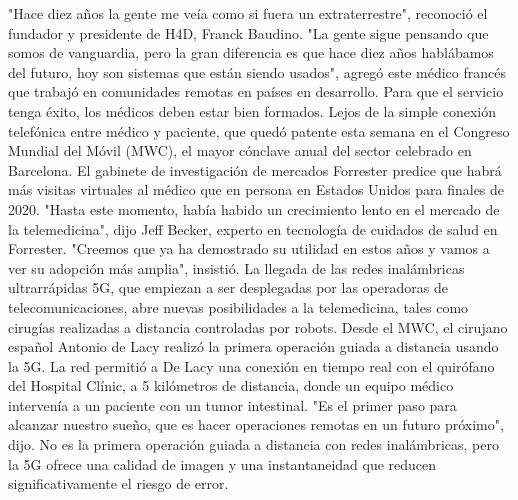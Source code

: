 \documentclass{article}%
\begin{document}
\newline%
%
"Hace diez años la gente me veía como si fuera un extraterrestre", reconoció el fundador y presidente de H4D, Franck Baudino.%
\newline%
%
"La gente sigue pensando que somos de vanguardia, pero la gran diferencia es que hace diez años hablábamos del futuro, hoy son sistemas que están siendo usados", agregó este médico francés que trabajó en comunidades remotas en países en desarrollo. \newline%
\newline%
Para que el servicio tenga éxito, los médicos deben estar bien formados.%
\newline%
%
Lejos de la simple conexión telefónica entre médico y paciente, que quedó patente esta semana en el Congreso Mundial del Móvil (MWC), el mayor cónclave anual del sector celebrado en Barcelona. \newline%
\newline%
El gabinete de investigación de mercados Forrester predice que habrá más visitas virtuales al médico que en persona en Estados Unidos para finales de 2020.%
\newline%
%
"Hasta este momento, había habido un crecimiento lento en el mercado de la telemedicina", dijo Jeff Becker, experto en tecnología de cuidados de salud en Forrester. \newline%
\newline%
"Creemos que ya ha demostrado su utilidad en estos años y vamos a ver su adopción más amplia", insistió.%
\newline%
%
La llegada de las redes inalámbricas ultrarrápidas 5G, que empiezan a ser desplegadas por las operadoras de telecomunicaciones, abre nuevas posibilidades a la telemedicina, tales como cirugías realizadas a distancia controladas por robots.%
\newline%
%
Desde el MWC, el cirujano español Antonio de Lacy realizó la primera operación guiada a distancia usando la 5G. \newline%
\newline%
La red permitió a De Lacy una conexión en tiempo real con el quirófano del Hospital Clínic, a 5 kilómetros de distancia, donde un equipo médico intervenía a un paciente con un tumor intestinal.%
\newline%
%
"Es el primer paso para alcanzar nuestro sueño, que es hacer operaciones remotas en un futuro próximo", dijo. \newline%
\newline%
No es la primera operación guiada a distancia con redes inalámbricas, pero la 5G ofrece una calidad de imagen y una instantaneidad que reducen significativamente el riesgo de error.%
\end{document}
